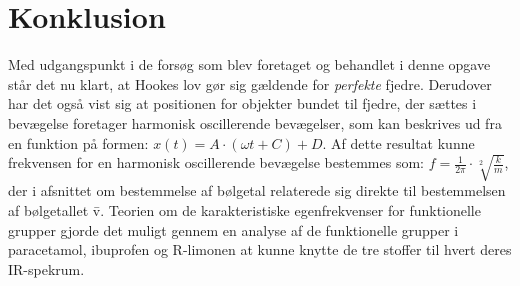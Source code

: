 \section{Konklusion}
Med udgangspunkt i de forsøg som blev foretaget og behandlet i denne opgave står det nu klart, at Hookes lov gør sig gældende for \emph{perfekte} fjedre. Derudover har det også vist sig at positionen for objekter bundet til fjedre, der sættes i bevægelse foretager harmonisk oscillerende bevægelser, som kan beskrives ud fra en funktion på formen: $x(t)=A \cdot (\omega t + C) + D$. Af dette resultat kunne frekvensen for en harmonisk oscillerende bevægelse bestemmes som: $f=\frac{1}{2\pi} \cdot \sqrt[2]{\frac{k}{m}}$, der i afsnittet om bestemmelse af bølgetal relaterede sig direkte til bestemmelsen af bølgetallet \={v}. Teorien om de karakteristiske egenfrekvenser for funktionelle grupper gjorde det muligt gennem en analyse af de funktionelle grupper i paracetamol, ibuprofen og R-limonen at kunne knytte de tre stoffer til hvert deres IR-spekrum.